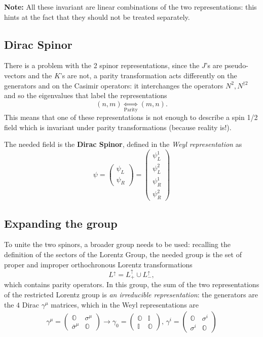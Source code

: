 \textbf{Note:} All these invariant are linear combinations of the two
representations: this hints at
the fact that they should not be treated separately.
\subsection{Dirac Spinor}
There is a problem with the 2 spinor representations, since the $J$'s are
pseudo-vectors and the $K$'s are not, a parity transformation acts differently on
the generators and on the
Casimir operators: it interchanges the operators $N^2, N^{\dagger2}$ and so the
eigenvalues that label the representations
$$(n,m)\underset{\text{Parity}}\iff(m,n).$$
This means that one of these representations is not enough to describe a spin 1/2
field which is invariant under parity transformations (because reality is!). 

The needed field is the \textbf{Dirac Spinor}, defined in the \textit{Weyl
representation} as
$$\psi = \begin{pmatrix}
\psi_L\\ \psi_R
\end{pmatrix} = \begin{pmatrix}
\psi^1_L \\ \psi^2_L \\ \psi^1_R \\ \psi^2_R
\end{pmatrix}
$$
\subsection{Expanding the group}
To unite the two spinors, a broader group needs to be used: recalling the
definition of the sectors of the Lorentz Group, the needed group is the set of
proper and improper orthochronous Lorentz transformations
$$L^\uparrow = L^\uparrow_+\cup L^\uparrow_-,$$
which contains parity operators.
In this group, the sum of the two representations of the restricted Lorentz group
is \textit{an irreducible representation}: the generators are the $4$ Dirac
$\gamma^\mu$ matrices, which in the Weyl representations are
\begin{gather*}
\gamma^\mu =\begin{pmatrix}
    \mathbb{O}&\sigma^\mu\\
    \bar\sigma^\mu&\mathbb{O}
\end{pmatrix}\longrightarrow
\gamma_0 = \begin{pmatrix}
    \mathbb{O}&\mathbb{I}\\
    \mathbb{I}&\mathbb{O}
\end{pmatrix},\,\gamma^i = \begin{pmatrix}
    \mathbb{O}&\sigma^i\\
    \sigma^i&\mathbb{O}
\end{pmatrix}
\end{gather*}

